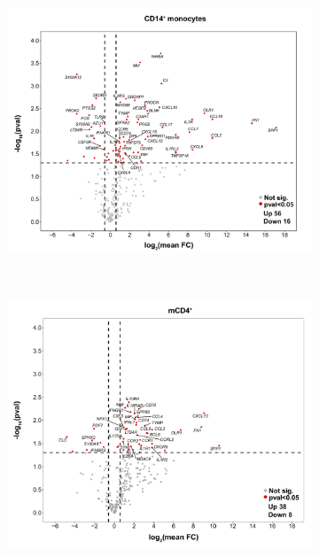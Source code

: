 \begin{figure}[htbp]
\centering
\begin{subfigure}{0.6\textwidth}
\centering
\includegraphics[width=\textwidth]{./Results3/pdfs/PSA_CD14_vulcano_plot_PCR_array_mean_FC}
\caption{\textbf{}}
\end{subfigure} \\
\begin{subfigure}{0.6\textwidth}
\centering
\includegraphics[width=\textwidth]{./Results3/pdfs/PSA_CD4_vulcano_plot_PCR_array_mean_FC}

\end{subfigure}
\end{figure}
